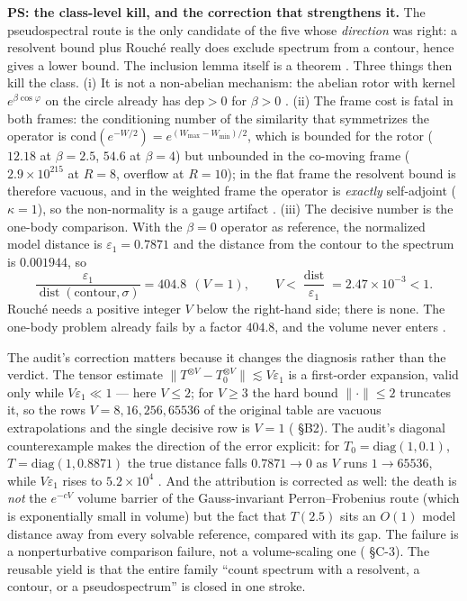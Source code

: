 \textbf{PS: the class-level kill, and the correction that strengthens it.} The pseudospectral route
is the only candidate of the five whose \emph{direction} was right: a resolvent bound plus Rouch\'e
really does exclude spectrum from a contour, hence gives a lower bound. The inclusion lemma itself
is a theorem \LT. Three things then kill the class. (i) It is not a non-abelian mechanism: the
abelian rotor with kernel $e^{\beta\cos\varphi}$ on the circle already has
$\mathrm{dep}>0$ for $\beta>0$ \LN. (ii) The frame cost is fatal in both frames: the conditioning
number of the similarity that symmetrizes the operator is
$\mathrm{cond}(e^{-W/2})=e^{(W_{\max}-W_{\min})/2}$, which is bounded for the rotor ($12.18$ at
$\beta=2.5$, $54.6$ at $\beta=4$) but unbounded in the co-moving frame ($2.9\times10^{215}$ at
$R=8$, overflow at $R=10$); in the flat frame the resolvent bound is therefore vacuous, and in the
weighted frame the operator is \emph{exactly} self-adjoint ($\kappa=1$), so the non-normality is a
gauge artifact \LN. (iii) The decisive number is the one-body comparison. With the $\beta=0$
operator as reference, the normalized model distance is $\varepsilon_1=0.7871$ and the distance
from the contour to the spectrum is $0.001944$, so
\[
  \frac{\varepsilon_1}{\operatorname{dist}(\text{contour},\sigma)}=404.8\ \ (V=1),
  \qquad
  V<\frac{\operatorname{dist}}{\varepsilon_1}=2.47\times10^{-3}<1 .
  \label{eq:ps404}
\]
Rouch\'e needs a positive integer $V$ below the right-hand side; there is none. The one-body
problem already fails by a factor $404.8$, and the volume never enters \LN.

The audit's correction matters because it changes the diagnosis rather than the verdict. The tensor
estimate $\lVert T^{\otimes V}-T_0^{\otimes V}\rVert\lesssim V\varepsilon_1$ is a first-order
expansion, valid only while $V\varepsilon_1\ll1$ --- here $V\le2$; for $V\ge3$ the hard bound
$\lVert\cdot\rVert\le2$ truncates it, so the rows $V=8,16,256,65536$ of the original table are
vacuous extrapolations and the single decisive row is $V=1$ ( \S B2). The audit's
diagonal counterexample makes the direction of the error explicit: for
$T_0=\mathrm{diag}(1,0.1)$, $T=\mathrm{diag}(1,0.8871)$ the true distance falls
$0.7871\to0$ as $V$ runs $1\to65536$, while $V\varepsilon_1$ rises to $5.2\times10^{4}$ \LE. And the
attribution is corrected as well: the death is \emph{not} the $e^{-cV}$ volume barrier of the
Gauss-invariant Perron--Frobenius route (which is exponentially small in volume) but the fact that
$T(2.5)$ sits an $O(1)$ model distance away from every solvable reference, compared with its gap.
The failure is a nonperturbative comparison failure, not a volume-scaling one (
\S C-3). The reusable yield is that the entire family ``count spectrum with a resolvent, a contour,
or a pseudospectrum'' is closed in one stroke.

